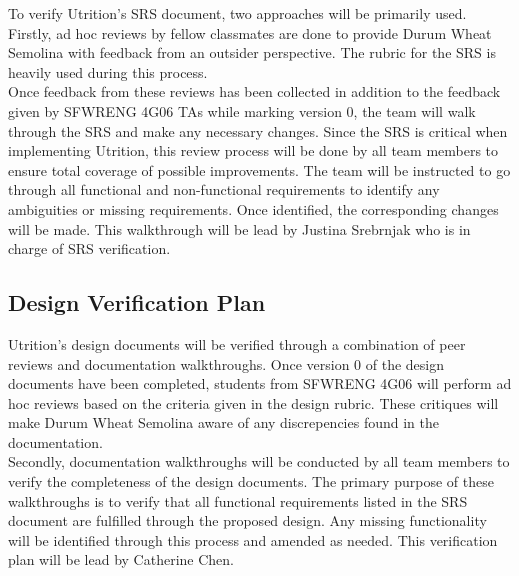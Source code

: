 \documentclass[12pt, titlepage]{article}
\begin{document}
	
	
	To verify Utrition's SRS document, two approaches will be primarily used. Firstly, ad hoc reviews by fellow classmates are done to provide Durum Wheat Semolina with feedback from an outsider perspective. The rubric for the SRS is heavily used during this process. \\
	
	Once feedback from these reviews has been collected in addition to the feedback given by SFWRENG 4G06 TAs while marking version 0, the team will walk through the SRS and make any necessary changes. Since the SRS is critical when implementing Utrition, this review process will be done by all team members to ensure total coverage of possible improvements. The team will be instructed to go through all functional and non-functional requirements to identify any ambiguities or missing requirements. Once identified, the corresponding changes will be made. This walkthrough will be lead by Justina Srebrnjak who is in charge of SRS verification.

	\subsection{Design Verification Plan}
	
	
	
	
	Utrition's design documents will be verified through a combination of peer reviews and documentation walkthroughs. Once version 0 of the design documents have been completed, students from SFWRENG 4G06 will perform ad hoc reviews based on the criteria given in the design rubric. These critiques will make Durum Wheat Semolina aware of any discrepencies found in the documentation.\\
	
	Secondly, documentation walkthroughs will be conducted by all team members to verify the completeness of the design documents. The primary purpose of these walkthroughs is to verify that all functional requirements listed in the SRS document are fulfilled through the proposed design. Any missing functionality will be identified through this process and amended as needed. This verification plan will be lead by Catherine Chen.
	
\end{document}
